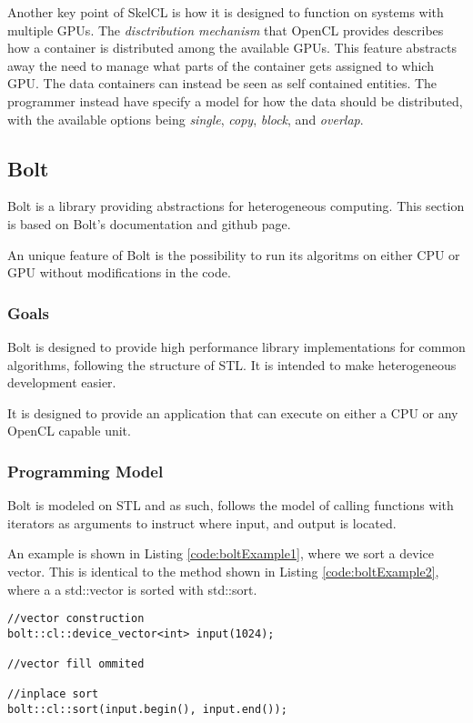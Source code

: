 Another key point of SkelCL is how it is designed to function on systems with multiple GPUs. The \textit{disctribution mechanism} that OpenCL provides describes how a container is distributed among the available GPUs. This feature abstracts away the need to manage what parts of the container gets assigned to which GPU. The data containers can instead be seen as self contained entities. The programmer instead have specify a model for how the data should be distributed, with the available options being \textit{single}, \textit{copy}, \textit{block}, and \textit{overlap}.

\subsection{Bolt}
Bolt is a library providing abstractions for heterogeneous computing. This section is based on Bolt's documentation\cite{boltDoc} and github page\cite{boltGithub}.

An unique feature of Bolt is the possibility to run its algoritms on either CPU or GPU without modifications in the code.

\subsubsection{Goals}
Bolt is designed to provide high performance library implementations for common algorithms, following the structure of STL. It is intended to make heterogeneous development easier.

It is designed to provide an application that can execute on either a CPU or any OpenCL capable unit.

\subsubsection{Programming Model}
Bolt is modeled on STL and as such, follows the model of calling functions with iterators as arguments to instruct where input, and output is located.

An example is shown in Listing \ref{code:boltExample1}, where we sort a device vector. This is identical to the method shown in Listing \ref{code:boltExample2}, where a a std::vector is sorted with std::sort.
\begin{lstlisting}[caption={Bolt sort example}, label={code:boltExample1}]
//vector construction
bolt::cl::device_vector<int> input(1024);

//vector fill ommited

//inplace sort
bolt::cl::sort(input.begin(), input.end());
\end{lstlisting}

